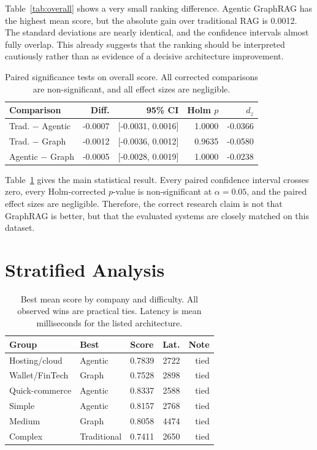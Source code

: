 \documentclass[10pt,twocolumn]{article}
\begin{document}
Table~\ref{tab:overall} shows a very small ranking difference. Agentic GraphRAG has the highest mean score, but the absolute gain over traditional RAG is 0.0012. The standard deviations are nearly identical, and the confidence intervals almost fully overlap. This already suggests that the ranking should be interpreted cautiously rather than as evidence of a decisive architecture improvement.

\begin{table}[t]
\centering
\small
\begin{tabular}{lrrrr}
\toprule
Comparison & Diff. & 95\% CI & Holm $p$ & $d_z$ \\
\midrule
Trad. $-$ Agentic & -0.0007 & [-0.0031, 0.0016] & 1.0000 & -0.0366 \\
Trad. $-$ Graph & -0.0012 & [-0.0036, 0.0012] & 0.9635 & -0.0580 \\
Agentic $-$ Graph & -0.0005 & [-0.0028, 0.0019] & 1.0000 & -0.0238 \\
\bottomrule
\end{tabular}
\caption{Paired significance tests on overall score. All corrected comparisons are non-significant, and all effect sizes are negligible.}
\label{tab:significance}
\end{table}

Table~\ref{tab:significance} gives the main statistical result. Every paired confidence interval crosses zero, every Holm-corrected $p$-value is non-significant at $\alpha=0.05$, and the paired effect sizes are negligible. Therefore, the correct research claim is not that GraphRAG is better, but that the evaluated systems are closely matched on this dataset.

\section{Stratified Analysis}

\begin{table}[t]
\centering
\small
\begin{tabular}{lllrr}
\toprule
Group & Best & Score & Lat. & Note \\
\midrule
Hosting/cloud & Agentic & 0.7839 & 2722 & tied \\
Wallet/FinTech & Graph & 0.7528 & 2898 & tied \\
Quick-commerce & Agentic & 0.8337 & 2588 & tied \\
Simple & Agentic & 0.8157 & 2768 & tied \\
Medium & Graph & 0.8058 & 4474 & tied \\
Complex & Traditional & 0.7411 & 2650 & tied \\
\bottomrule
\end{tabular}
\caption{Best mean score by company and difficulty. All observed wins are practical ties. Latency is mean milliseconds for the listed architecture.}
\label{tab:strata}
\end{table}
\end{document}
